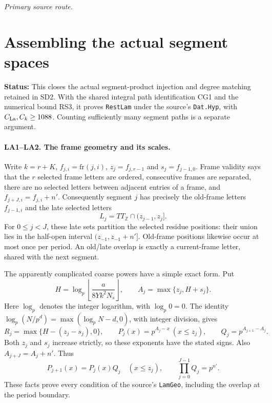 \documentclass[11pt,a4paper]{article}
\numberwithin{equation}{section}
\theoremstyle{remark}\newtheorem{remark}[theorem]{Remark}
\newcommand{\status}[1]{\textbf{Status:} #1}
\begin{document}
\noindent\textit{Primary source route.}\cite{coarse-lift}

\section{Assembling the actual segment spaces}
\label{sec:segment-assembly}

\status{This closes the actual segment-product injection and degree matching retained in SD2. With the shared integral path identification CG1 and the numerical bound RS3, it proves \texttt{RestLam} under the source's \texttt{Dat.Hyp}, with $C_{\rm La},C_k\ge1088$. Counting sufficiently many segment paths is a separate argument.}

\paragraph{LA1--LA2. The frame geometry and its scales.}
Write $k=r+K$, $f_{j,i}=\mathrm{fr}(j,i)$, $z_j=f_{j,r-1}$ and $s_j=f_{j-1,0}$.
Frame validity says that the $r$ selected frame letters are ordered, consecutive frames are separated, there are no selected letters between adjacent entries of a frame, and
$f_{j+J,i}=f_{j,i}+n'$.
Consequently segment $j$ has precisely the old-frame letters $f_{j-1,i}$ and the late selected letters
\[
 L_j=TT_{\mathbb Z}\cap(z_{j-1},z_j].
\]
For $0\le j<J$, these late sets partition the selected residue positions: their union lies in the half-open interval $(z_{-1},z_{-1}+n']$.
Old-frame positions likewise occur at most once per period. An old/late overlap is exactly a current-frame letter, shared with the next segment.

The apparently complicated coarse powers have a simple exact form. Put
\[
 H=\log_p\left\lfloor\frac{a}{8Yk^2N_s}\right\rfloor,
 \qquad A_j=\max\{z_j,H+s_j\}.
\]
Here $\log_p$ denotes the integer logarithm, with $\log_p0=0$.
The identity $\log_p(N/p^d)=\max(\log_pN-d,0)$, with integer division, gives
\[
 R_j=\max\{H-(z_j-s_j),0\},\qquad
 P_j(x)=p^{A_j-x}\ (x\le z_j),\qquad Q_j=p^{A_{j+1}-A_j}. \tag{LA.1}
\]
Both $z_j$ and $s_j$ increase strictly, so these exponents have the stated signs.
Also $A_{j+J}=A_j+n'$. Thus
\[
 P_{j+1}(x)=P_j(x)Q_j\quad(x\le z_j),
 \qquad \prod_{j=0}^{J-1}Q_j=p^{n'}. \tag{LA.2}
\]
These facts prove every condition of the source's \texttt{LamGeo}, including the overlap at the period boundary.
\end{document}
